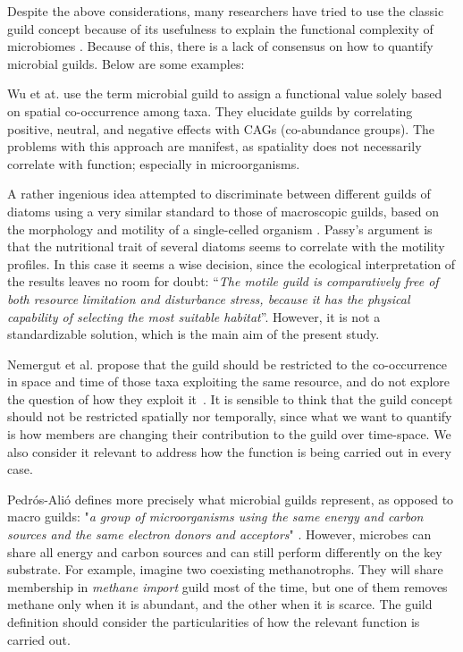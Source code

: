 \documentclass[Journal,letterpaper,NoLists]{ascelike-new}
\begin{document}
Despite the above considerations, many researchers have tried to use the classic guild concept because of its usefulness to explain the functional complexity of microbiomes \cite{veshareh2021novel,jones2014recently,martinovic2021temporal}. Because of this, there is a lack of consensus on how to quantify microbial guilds. Below are some examples: 

Wu et at. \cite{wu2021guild} use the term microbial guild to assign a functional value solely based on spatial co-occurrence among taxa. They elucidate guilds by correlating positive, neutral, and negative effects with CAGs (co-abundance groups). The problems with this approach are manifest, as spatiality does not necessarily correlate with function; especially in microorganisms. 

A rather ingenious idea attempted to discriminate between different guilds of diatoms using a very similar standard to those of macroscopic guilds, based on the morphology and motility of a single-celled organism \cite{passy2007diatom}. Passy's argument is that the nutritional trait of several diatoms seems to correlate with the motility profiles. In this case it seems a wise decision, since the ecological interpretation of the results leaves no room for doubt: “\textit{The motile guild is comparatively free of both resource limitation and disturbance stress, because it has the physical capability of selecting the most suitable habitat}”. However, it is not a standardizable solution, which is the main aim of the present study.

Nemergut et al. propose that the guild should be restricted to the co-occurrence in space and time of those taxa exploiting the same resource, and do not explore the question of how they exploit it~\cite{nemergut2013patterns}. It is sensible to think that the guild concept should not be restricted spatially nor temporally, since what we want to quantify is how members are changing their contribution to the guild over time-space. We also consider it relevant to address how the function is being carried out in every case.

Pedrós-Alió defines more precisely what microbial guilds represent, as opposed to macro guilds: "\textit{a group of microorganisms using the same energy and carbon sources and the same electron donors and acceptors}" \cite{pedros1989toward}. However, microbes can share all energy and carbon sources and can still perform differently on the key substrate. For example, imagine two coexisting methanotrophs. They will share membership in \textit{methane import} guild most of the time, but one of them removes methane only when it is abundant, and the other when it is scarce. The guild definition should consider the particularities of how the relevant function is carried out.
\end{document}
